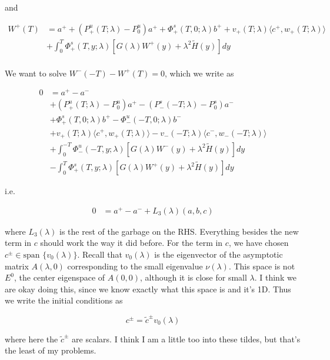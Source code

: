 \documentclass[12pt]{article}
\begin{document}
\begin{enumerate}
and

\begin{align*}
W^+(T) &= a^+ + (P^u_+(T; \lambda) - P_0^u)a^+ + \Phi^s_+(T, 0; \lambda)b^+ + v_+(T; \lambda) \langle c^+, w_+(T; \lambda) \rangle \\
&+ \int_0^T \Phi^s_+(T, y; \lambda) [ G(\lambda)W^+(y) + \lambda^2 \tilde{H}(y) ] dy \\
\end{align*}

We want to solve $W^-(-T) - W^+(T) = 0$, which we write as

\begin{align*}
0 &= a^+ - a^- \\
&+ (P^u_+(T; \lambda) - P_0^u)a^+ - (P^s_-(-T; \lambda) - P_0^s)a^- \\
&+ \Phi^s_+(T, 0; \lambda)b^+ - \Phi^u_-(-T, 0; \lambda)b^- \\
&+ v_+(T; \lambda) \langle c^+, w_+(T; \lambda) \rangle - v_-(-T; \lambda) \langle c^-, w_-(-T; \lambda) \rangle \\
&+ \int_0^{-T} \Phi^u_-(-T, y; \lambda) [ G(\lambda)W^-(y) + \lambda^2 \tilde{H}(y) ] dy \\
&- \int_0^T \Phi^s_+(T, y; \lambda) [ G(\lambda)W^+(y) + \lambda^2 \tilde{H}(y) ] dy
\end{align*}

i.e. 

\begin{align*}
0 &= a^+ - a^- + L_3(\lambda)(a, b, c)
\end{align*}

where $L_3(\lambda)$ is the rest of the garbage on the RHS. Everything besides the new term in $c$ should work the way it did before. For the term in $c$, we have chosen $c^\pm \in \text{span }\{v_0(\lambda)\}$. Recall that $v_0(\lambda)$ is the eigenvector of the asymptotic matrix $A(\lambda, 0)$ corresponding to the small eigenvalue $\nu(\lambda)$. This space is not $E^0$, the center eigenspace of $A(0, 0)$, although it is close for small $\lambda$. I think we are okay doing this, since we know exactly what this space is and it's 1D. Thus we write the initial conditions as 

\[
c^\pm = \tilde{c}^\pm v_0(\lambda)
\]

where here the $\tilde{c}^\pm$ are scalars. I think I am a little too into these tildes, but that's the least of my problems.


\end{enumerate}
\end{document}
